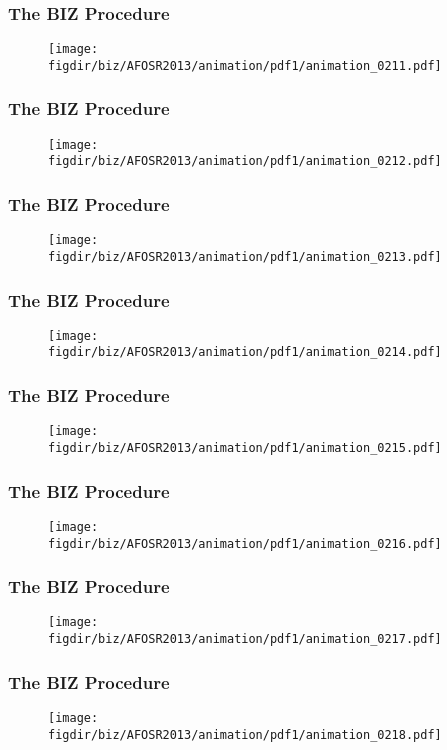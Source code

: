 \documentclass[13pt]{beamer}
\newcommand{\figdir}{../../fig}
\begin{document}
\begin{frame}\frametitle{The BIZ Procedure}\begin{figure}\texttt{[image: \\figdir/biz/AFOSR2013/animation/pdf1/animation\_0211.pdf]}\end{figure}\end{frame}
\begin{frame}\frametitle{The BIZ Procedure}\begin{figure}\texttt{[image: \\figdir/biz/AFOSR2013/animation/pdf1/animation\_0212.pdf]}\end{figure}\end{frame}
\begin{frame}\frametitle{The BIZ Procedure}\begin{figure}\texttt{[image: \\figdir/biz/AFOSR2013/animation/pdf1/animation\_0213.pdf]}\end{figure}\end{frame}
\begin{frame}\frametitle{The BIZ Procedure}\begin{figure}\texttt{[image: \\figdir/biz/AFOSR2013/animation/pdf1/animation\_0214.pdf]}\end{figure}\end{frame}
\begin{frame}\frametitle{The BIZ Procedure}\begin{figure}\texttt{[image: \\figdir/biz/AFOSR2013/animation/pdf1/animation\_0215.pdf]}\end{figure}\end{frame}
\begin{frame}\frametitle{The BIZ Procedure}\begin{figure}\texttt{[image: \\figdir/biz/AFOSR2013/animation/pdf1/animation\_0216.pdf]}\end{figure}\end{frame}
\begin{frame}\frametitle{The BIZ Procedure}\begin{figure}\texttt{[image: \\figdir/biz/AFOSR2013/animation/pdf1/animation\_0217.pdf]}\end{figure}\end{frame}
\begin{frame}\frametitle{The BIZ Procedure}\begin{figure}\texttt{[image: \\figdir/biz/AFOSR2013/animation/pdf1/animation\_0218.pdf]}\end{figure}\end{frame}
\end{document}
